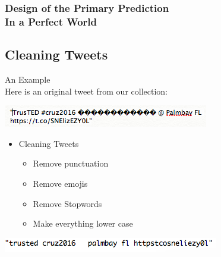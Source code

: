 \documentclass[xcolor=dvipsnames]{beamer}
\begin{document}

\begin{frame}
\frametitle{Design of the Primary Prediction \\ \small In a Perfect World}
\subsection{Cleaning Tweets}
\large{An Example}\\
 Here is an original tweet from our collection: 
\begin{center}
\includegraphics[scale=0.5]{uncleantweets3.png}
\end{center}
	\begin{itemize}
	\item Cleaning Tweets
	\begin{itemize}
		\item Remove punctuation
		\item Remove emojis
		\item Remove Stopwords
		\item Make everything lower case
	\end{itemize}
	\end{itemize}
\begin{center}
\includegraphics[scale=0.5]{CleanTweet.png}
\end{center}
\end{frame}
\end{document}
